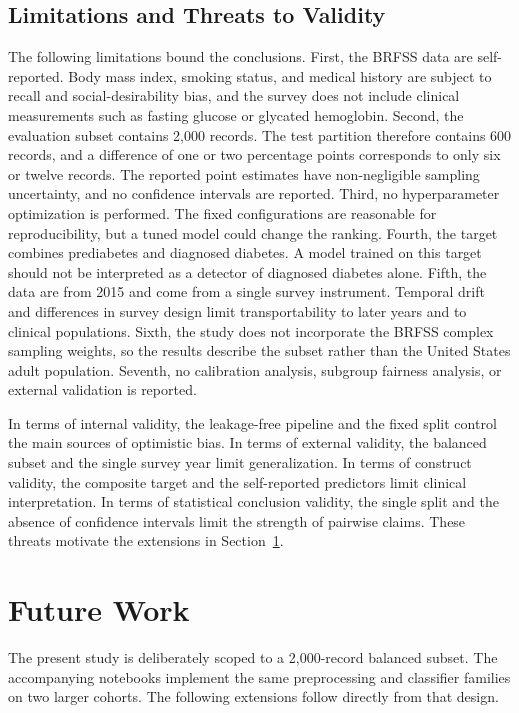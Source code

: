 \documentclass[conference]{IEEEtran}
\begin{document}
\subsection{Limitations and Threats to Validity}

The following limitations bound the conclusions. First, the BRFSS data are self-reported. Body mass index, smoking status, and medical history are subject to recall and social-desirability bias, and the survey does not include clinical measurements such as fasting glucose or glycated hemoglobin. Second, the evaluation subset contains 2,000 records. The test partition therefore contains 600 records, and a difference of one or two percentage points corresponds to only six or twelve records. The reported point estimates have non-negligible sampling uncertainty, and no confidence intervals are reported. Third, no hyperparameter optimization is performed. The fixed configurations are reasonable for reproducibility, but a tuned model could change the ranking. Fourth, the target combines prediabetes and diagnosed diabetes. A model trained on this target should not be interpreted as a detector of diagnosed diabetes alone. Fifth, the data are from 2015 and come from a single survey instrument. Temporal drift and differences in survey design limit transportability to later years and to clinical populations. Sixth, the study does not incorporate the BRFSS complex sampling weights, so the results describe the subset rather than the United States adult population. Seventh, no calibration analysis, subgroup fairness analysis, or external validation is reported.

In terms of internal validity, the leakage-free pipeline and the fixed split control the main sources of optimistic bias. In terms of external validity, the balanced subset and the single survey year limit generalization. In terms of construct validity, the composite target and the self-reported predictors limit clinical interpretation. In terms of statistical conclusion validity, the single split and the absence of confidence intervals limit the strength of pairwise claims. These threats motivate the extensions in Section~\ref{sec:future}.

\section{Future Work}
\label{sec:future}

The present study is deliberately scoped to a 2,000-record balanced subset. The accompanying notebooks implement the same preprocessing and classifier families on two larger cohorts. The following extensions follow directly from that design.
\end{document}
